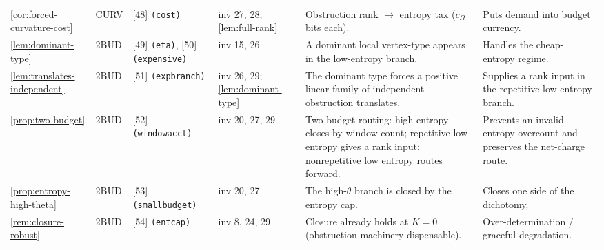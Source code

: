 \documentclass[11pt]{article}
\begin{document}
{\begin{longtable}{L{0.10\textwidth} C{0.045\textwidth} L{0.13\textwidth} L{0.135\textwidth} L{0.28\textwidth} L{0.20\textwidth}}
\cref{cor:forced-curvature-cost} & CURV & [48] \texttt{(cost)} & inv 27, 28; \cref{lem:full-rank} & Obstruction rank $\to$ entropy tax ($c_\Omega$ bits each). & Puts demand into budget currency. \\
\cref{lem:dominant-type} & 2BUD & [49] \texttt{(eta)}, [50] \texttt{(expensive)} & inv 15, 26 & A dominant local vertex-type appears in the low-entropy branch. & Handles the cheap-entropy regime. \\
\cref{lem:translates-independent} & 2BUD & [51] \texttt{(expbranch)} & inv 26, 29; \cref{lem:dominant-type} & The dominant type forces a positive linear family of independent obstruction translates. & Supplies a rank input in the repetitive low-entropy branch. \\
\cref{prop:two-budget} & 2BUD & [52] \texttt{(windowacct)} & inv 20, 27, 29 & Two-budget routing: high entropy closes by window count; repetitive low entropy gives a rank input; nonrepetitive low entropy routes forward. & Prevents an invalid entropy overcount and preserves the net-charge route. \\
\cref{prop:entropy-high-theta} & 2BUD & [53] \texttt{(smallbudget)} & inv 20, 27 & The high-$\theta$ branch is closed by the entropy cap. & Closes one side of the dichotomy. \\
\cref{rem:closure-robust} & 2BUD & [54] \texttt{(entcap)} & inv 8, 24, 29 & Closure already holds at $K=0$ (obstruction machinery dispensable). & Over-determination / graceful degradation. \\
\bottomrule
\end{longtable}
}
\end{document}
